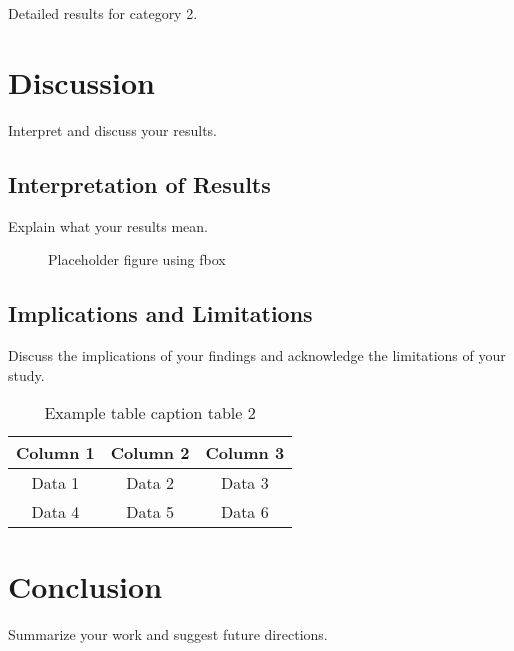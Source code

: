 Detailed results for category 2.

\chapter{Discussion}

Interpret and discuss your results.

\section{Interpretation of Results}

Explain what your results mean. 
\begin{figure}[ht]
    \centering
    \caption{Placeholder figure using fbox}
    \label{fig:example2}
\end{figure}

\section{Implications and Limitations}

Discuss the implications of your findings and acknowledge the limitations of your study. 
\begin{table}[ht]
    \centering
    \begin{tabular}{|c|c|c|}
        \hline
        Column 1 & Column 2 & Column 3 \\
        \hline
        Data 1 & Data 2 & Data 3 \\
        Data 4 & Data 5 & Data 6 \\
        \hline
    \end{tabular}
    \caption{Example table caption table 2}
    \label{tab:example2}
\end{table}

\chapter{Conclusion}

Summarize your work and suggest future directions.

